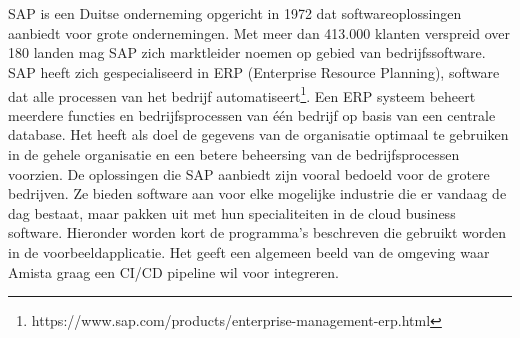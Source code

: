 \chapter{}
\label{ch:sap}
SAP is een Duitse onderneming opgericht in 1972 dat softwareoplossingen aanbiedt voor grote ondernemingen. Met meer dan 413.000 klanten verspreid over 180 landen mag SAP zich marktleider noemen op gebied van bedrijfssoftware.
SAP heeft zich gespecialiseerd in ERP (Enterprise Resource Planning), software dat alle processen van het bedrijf automatiseert\footnote{https://www.sap.com/products/enterprise-management-erp.html}. Een ERP systeem beheert meerdere functies en bedrijfsprocessen van één bedrijf op basis van een centrale database. Het heeft als doel de gegevens van de organisatie optimaal te gebruiken in de gehele organisatie en een betere beheersing van de bedrijfsprocessen voorzien.
De oplossingen die SAP aanbiedt zijn vooral bedoeld voor de grotere bedrijven. Ze bieden software aan voor elke mogelijke industrie die er vandaag de dag bestaat, maar pakken uit met hun specialiteiten in de cloud business software.
Hieronder worden kort de programma's beschreven die gebruikt worden in de voorbeeldapplicatie. Het geeft een algemeen beeld van de omgeving waar Amista graag een CI/CD pipeline wil voor integreren.

